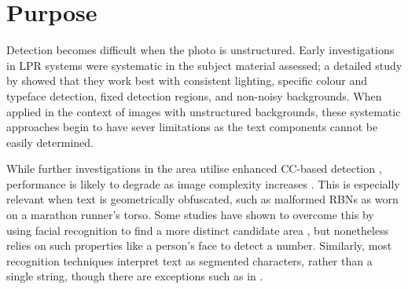 \section{Purpose}
\label{sec:purpose}

Detection becomes difficult when the photo is unstructured. Early investigations in LPR systems were systematic in the subject material assessed; a detailed study by \cite{Anagnostopoulos:2008vu} showed that they work best  with consistent lighting, specific colour and typeface detection, fixed detection regions, and non-noisy backgrounds. When applied in the context of images with unstructured backgrounds, these systematic approaches begin to have sever limitations as the text components cannot be easily determined.

While further investigations in the area utilise enhanced CC-based detection \citep{Chen:2011ul,Shivakumara:2011dl,Epshtein:2010tj}, performance is likely to degrade as image complexity increases \citep{Li:2012wd}. This is especially relevant when text is geometrically obfuscated, such as malformed RBNs as worn on a marathon runner's torso. Some studies have shown to overcome this by using facial recognition to find a more distinct candidate area \citep{Benami:2012jf}, but nonetheless relies on such properties like a person's face to detect a number. Similarly, most recognition techniques interpret text as segmented characters, rather than a single string, though there are exceptions such as in \cite{Zhu:2016ut}.